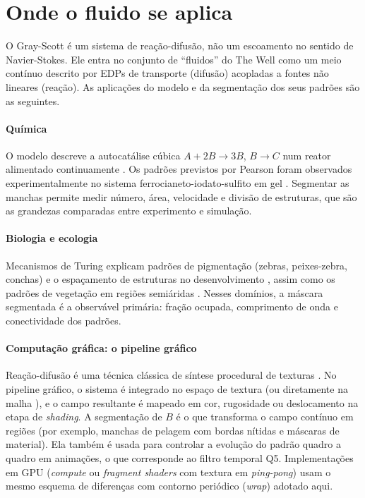 \section{Onde o fluido se aplica}
\label{sec:aplicacoes}

O Gray-Scott é um sistema de reação-difusão, não um escoamento no sentido de Navier-Stokes. Ele
entra no conjunto de ``fluidos'' do The Well como um meio contínuo descrito por EDPs de
transporte (difusão) acopladas a fontes não lineares (reação). As aplicações do modelo e da
segmentação dos seus padrões são as seguintes.

\paragraph{Química} O modelo descreve a autocatálise cúbica $A + 2B \to 3B$, $B \to C$ num
reator alimentado continuamente \cite{grayscott1984}. Os padrões previstos por Pearson
\cite{pearson1993} foram observados experimentalmente no sistema ferrocianeto-iodato-sulfito em gel
\cite{lee1993}. Segmentar as manchas permite medir número, área, velocidade e divisão de
estruturas, que são as grandezas comparadas entre experimento e simulação.

\paragraph{Biologia e ecologia} Mecanismos de Turing explicam padrões de pigmentação (zebras,
peixes-zebra, conchas) e o espaçamento de estruturas no desenvolvimento \cite{kondo2010,murray2003},
assim como os padrões de vegetação em regiões semiáridas \cite{klausmeier1999}. Nesses domínios, a
máscara segmentada é a observável primária: fração ocupada, comprimento de onda e conectividade
dos padrões.

\paragraph{Computação gráfica: o pipeline gráfico} Reação-difusão é uma técnica clássica de
síntese procedural de texturas \cite{turk1991,witkin1991}. No pipeline gráfico, o sistema é
integrado no espaço de textura (ou diretamente na malha \cite{turk1991}), e o campo resultante é
mapeado em cor, rugosidade ou deslocamento na etapa de \emph{shading}. A segmentação de $B$ é o
que transforma o campo contínuo em regiões (por exemplo, manchas de pelagem com bordas nítidas e
máscaras de material). Ela também é usada para controlar a evolução do padrão quadro a quadro em
animações, o que corresponde ao filtro temporal Q5. Implementações em GPU (\emph{compute} ou
\emph{fragment shaders} com textura em \emph{ping-pong}) usam o mesmo esquema de diferenças com
contorno periódico (\emph{wrap}) adotado aqui.

